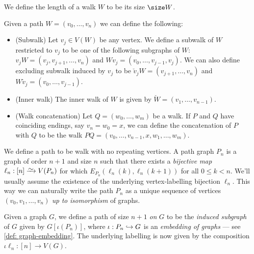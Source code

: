 \begin{definition}[Length]\label{def: walk-length}
We define the length of a walk \(W\) to be its size \(\size W\).
\end{definition}

\begin{definition}\label{def: walk-operations}
Given a path \(W = (v_0, \dots, v_n)\) we can define the following:
\begin{itemize}
  \setlength\itemsep{0.0em}
  \item (Subwalk) Let \(v_j \in V(W)\) be any vertex. We define a subwalk of
    \(W\) restricted to \(v_j\) to be one of the following subgraphs of \(W\):
    \(v_jW = (v_j, v_{j+1}, \dots, v_n)\) and \(Wv_j = (v_0, \dots, v_{j-1},
    v_j)\). We can also define excluding subwalk induced by \(v_j\) to be
    \(\breve v_j W = (v_{j+1}, \dots, v_n)\) and \(W \breve v_j = (v_0, \dots,
    v_{j-1})\).
  \item (Inner walk) The inner walk of \(W\) is given by \(\breve W = (v_1,
    \dots, v_{n-1})\).
  \item (Walk concatenation) Let \(Q = (w_0, \dots, w_m)\) be a walk.
    If \(P\) and \(Q\) have coinciding endings, say \(v_n = w_0 = x\), we can
    define the concatenation of \(P\) with \(Q\) to be the walk \(PQ = (v_0,
    \dots, v_{n-1}, x, w_1, \dots, w_m)\).
\end{itemize}
\end{definition}

\begin{definition}[Path]\label{def: path}
We define a path to be walk with no repeating vertices. A path graph \(P_n\)
is a graph of order \(n + 1\) and size \(n\) such that there exists a
\emph{bijective map} \(\ell_n: [n] \isoto V(P_n)\) for which
\(E_{P_n}(\ell_n(k), \ell_n(k+1))\) for all \(0 \leq k < n\). We'll usually
assume the existence of the underlying vertex-labelling bijection \(\ell_n\).
This way we can naturally write the path \(P_n\) as a unique sequence of
vertices \((v_0, v_1, \dots, v_n)\) \emph{up to isomorphism} of graphs.

Given a graph \(G\), we define a path of size \(n + 1\) \emph{on} \(G\) to be
the \emph{induced subgraph} of \(G\) given by \(G[\iota(P_n)]\), where
\(\iota: P_n \hookrightarrow G\) is an \emph{embedding of graphs} --- see \cref{def:
graph-embedding}. The underlying labelling is now given by the composition
\(\iota \ell_n: [n] \to V(G)\).
\end{definition}

